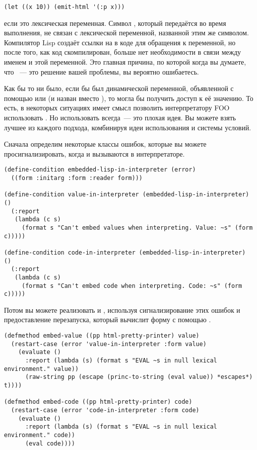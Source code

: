 \begin{lstlisting}
(let ((x 10)) (emit-html '(:p x)))
\end{lstlisting}

если  это лексическая переменная. Символ , который передаётся
 во время выполнения, не связан с лексической переменной, названной этим
же символом. Компилятор Lisp создаёт ссылки на  в коде для обращения к переменной,
но после того, как код скомпилирован, больше нет необходимости в связи между именем
 и этой переменной. Это главная причина, по которой когда вы думаете, что
~--- это решение вашей проблемы, вы вероятно ошибаетесь.

Как бы то ни было, если бы  был динамической переменной, объявленной с помощью
 или  (и назван  вместо ), то
 могла бы получить доступ к её значению.  То есть, в некоторых ситуациях имеет
смысл позволить интерпретатору FOO использовать . Но использовать 
всегда~--- это плохая идея. Вы можете взять лучшее из каждого подхода, комбинируя идеи
использования  и системы условий.

Сначала определим некоторые классы ошибок, которые вы можете просигнализировать,
когда и  вызываются в интерпретаторе.

\begin{lstlisting}
(define-condition embedded-lisp-in-interpreter (error)
  ((form :initarg :form :reader form)))

(define-condition value-in-interpreter (embedded-lisp-in-interpreter) ()
  (:report
   (lambda (c s) 
     (format s "Can't embed values when interpreting. Value: ~s" (form c)))))

(define-condition code-in-interpreter (embedded-lisp-in-interpreter) ()
  (:report
   (lambda (c s) 
     (format s "Can't embed code when interpreting. Code: ~s" (form c)))))
\end{lstlisting}

Потом вы можете реализовать  и , используя
сигнализирование этих ошибок и предоставление перезапуска, который вычислит форму с
помощью .

\begin{lstlisting}
(defmethod embed-value ((pp html-pretty-printer) value)
  (restart-case (error 'value-in-interpreter :form value)
    (evaluate ()
      :report (lambda (s) (format s "EVAL ~s in null lexical environment." value))
      (raw-string pp (escape (princ-to-string (eval value)) *escapes*) t))))

(defmethod embed-code ((pp html-pretty-printer) code)
  (restart-case (error 'code-in-interpreter :form code)
    (evaluate ()
      :report (lambda (s) (format s "EVAL ~s in null lexical environment." code))
      (eval code))))
\end{lstlisting}

